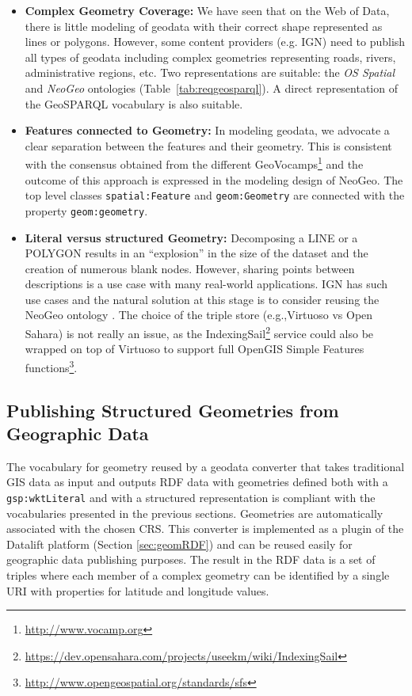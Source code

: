 \begin{itemize}
\item\textbf{Complex Geometry Coverage:} We have seen that on the Web of Data, there is little modeling of geodata with their correct shape represented as lines or polygons. However, some content providers (e.g. IGN) need to publish all types of geodata including complex geometries representing roads, rivers, administrative regions, etc. Two representations are suitable: the \textit{OS Spatial} and \textit{NeoGeo} ontologies (Table~\ref{tab:reqgeosparql}). A direct representation of the GeoSPARQL vocabulary is also suitable.

\item \textbf{Features connected to Geometry:} In modeling geodata, we advocate a clear separation between the features and their geometry. This is consistent with the consensus obtained from the different GeoVocamps\footnote{\url{http://www.vocamp.org}} and the outcome of this approach is expressed in the modeling design of NeoGeo. The top level classes \texttt{spatial:Feature} and \texttt{geom:Geometry} are connected with the property \texttt{geom:geometry}.

\item \textbf{Literal versus structured Geometry:} Decomposing a LINE or a POLYGON results in an ``explosion'' in the size of the dataset and the creation of numerous blank nodes. However, sharing points between descriptions is a use case with many real-world applications. IGN has such use cases and the natural solution at this stage is to consider reusing the NeoGeo ontology . The choice of the triple store (e.g.,Virtuoso vs Open Sahara) is not really an issue, as the IndexingSail\footnote{\url{https://dev.opensahara.com/projects/useekm/wiki/IndexingSail}} service could also be wrapped on top of Virtuoso to support full OpenGIS Simple Features functions\footnote{\url{http://www.opengeospatial.org/standards/sfs}}.
\end{itemize}


\subsection*{Publishing Structured Geometries from Geographic Data}
The vocabulary for geometry reused by a geodata converter that takes traditional GIS data as input and outputs RDF data with geometries defined both with a \texttt{gsp:wktLiteral} and with a structured representation is compliant with the vocabularies presented in the previous sections. Geometries are automatically associated with the chosen CRS. This converter is implemented as a plugin of the Datalift platform (Section \ref{sec:geomRDF}) and can be reused easily for geographic data publishing purposes. The result in the RDF data is a set of triples where each member of a complex geometry can be identified by a single URI with properties for latitude and longitude values.


